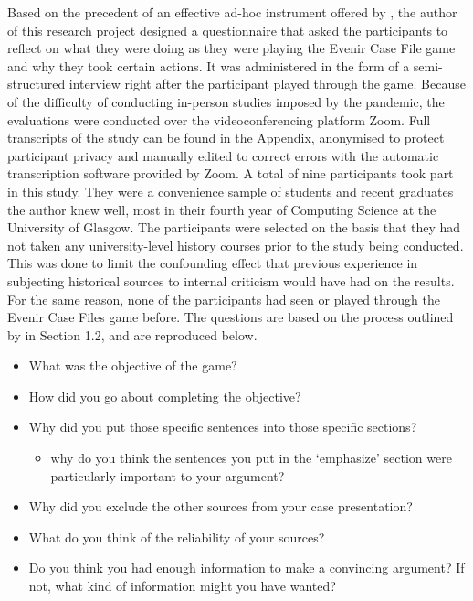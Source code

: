\documentclass{l4proj}
\begin{document}
Based on the precedent of an effective ad-hoc instrument offered by \citet{gelerstein2016designing}, the author of this research project designed a questionnaire that asked the participants to reflect on what they were doing as they were playing the Evenir Case File game and why they took certain actions. It was administered in the form of a semi-structured interview right after the participant played through the game. Because of the difficulty of conducting in-person studies imposed by the pandemic, the evaluations were conducted over the videoconferencing platform Zoom. Full transcripts of the study can be found in the Appendix, anonymised to protect participant privacy and manually edited to correct errors with the automatic transcription software provided by Zoom. A total of nine participants took part in this study. They were a convenience sample of students and recent graduates the author knew well, most in their fourth year of Computing Science at the University of Glasgow. The participants were selected on the basis that they had not taken any university-level history courses prior to the study being conducted. This was done to limit the confounding effect that previous experience in subjecting historical sources to internal criticism would have had on the results. For the same reason, none of the participants had seen or played through the Evenir Case Files game before. The questions are based on the process outlined by \citet{tosh2006pursuit} in Section 1.2, and are reproduced below. 
\begin{itemize}
    \item What was the objective of the game? 
    \item How did you go about completing the objective?
    \item Why did you put those specific sentences into those specific sections?
    \begin{itemize}
        \item why do you think the sentences you put in the ‘emphasize’ section were particularly important to your argument?
    \end{itemize}
    \item Why did you exclude the other sources from your case presentation?
    \item What do you think of the reliability of your sources?
    \item Do you think you had enough information to make a convincing argument? If not, what kind of information might you have wanted?
\end{itemize}
\end{document}
